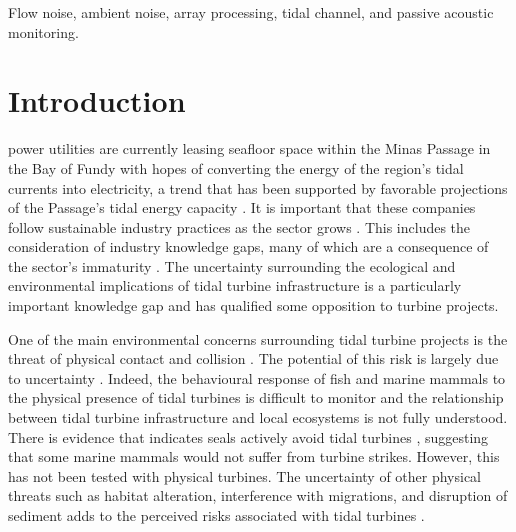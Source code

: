 \documentclass[12pt,journal,onecolumn]{IEEEtran}
\begin{document}
\begin{IEEEkeywords}
Flow noise, ambient noise, array processing, tidal channel, and passive acoustic monitoring.
\end{IEEEkeywords}






%
\IEEEpeerreviewmaketitle



\section{Introduction}
\label{I}
% 
% 
% 
% 
 power utilities are currently leasing seafloor space within the Minas Passage in the Bay of Fundy with hopes of converting the energy of the region's tidal currents into electricity, a trend that has been supported by favorable projections of the Passage's tidal energy capacity \cite{karsten}. It is important that these companies follow sustainable industry practices as the sector grows \cite{yang}. This includes the consideration of industry knowledge gaps, many of which are a consequence of the sector's immaturity \cite{inger}. The uncertainty surrounding the ecological and environmental implications of tidal turbine infrastructure is a particularly important knowledge gap \cite{polagye} and has qualified some opposition to turbine projects. 

One of the main environmental concerns surrounding tidal turbine projects is the threat of physical contact and collision \cite{dadswell} \cite{redden}. The potential of this risk is largely due to uncertainty \cite{copping}. Indeed, the behavioural response of fish and marine mammals to the physical presence of tidal turbines is difficult to monitor and the relationship between tidal turbine infrastructure and local ecosystems is not fully understood. There is evidence that indicates seals actively avoid tidal turbines \cite{hastie}, suggesting that some marine mammals would not suffer from turbine strikes. However, this has not been tested with physical turbines. The uncertainty of other physical threats such as habitat alteration, interference with migrations, and disruption of sediment adds to the perceived risks associated with tidal turbines \cite{polagye}. 
\end{document}
